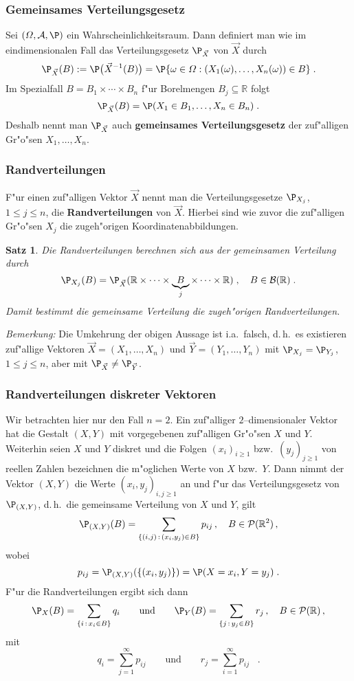 \documentclass[ngerman,draft,parskip=half,twoside]{scrartcl}
\newtheorem{thm}{Satz}[section]
\newcommand*{\R}{\mathbb{R}}      %
\newcommand*{\Algeb}{\mathcal{A}}   %
\newcommand*{\BorelM}{\mathcal{B}}  %
\newcommand*{\PotM}{\mathcal{P}}    %
\begin{document}
\subsubsection{Gemeinsames Verteilungsgesetz}
Sei $(\Omega,\Algeb,\P)$ ein Wahrscheinlichkeitsraum. Dann definiert
man wie im eindimensionalen Fall das Verteilungsgesetz $\P_{\vec X}$ von $\vec X$
durch
$$
\P_{\vec X}(B):=\P\big(\vec X^{-1}(B)\big)=\P\{\omega\in\Omega : (X_1(\omega),\ldots,X_n(\omega))\in B\}\;.
$$
Im Spezialfall $B=B_1\times\cdots\times B_n$ f"ur Borelmengen $B_j\subseteq\R$ folgt
$$
\P_{\vec X}(B)=\P(X_1\in B_1,\ldots, X_n\in B_n)\;.
$$
Deshalb nennt man $\P_{\vec X}$ auch \textbf{gemeinsames Verteilungsgesetz} der zuf"alligen
Gr"o"sen $X_1,\ldots,X_n$.
\subsubsection{Randverteilungen}
F"ur einen zuf"alligen Vektor $\vec X$ nennt man die Verteilungsgesetze $\P_{X_j}$, $1\le j\le n$,
die \textbf{Randverteilungen} von $\vec X$. Hierbei sind wie zuvor die zuf"alligen Gr"o"sen $X_j$ die
zugeh"origen Koordinatenabbildungen.
\begin{thm}
Die Randverteilungen berechnen sich aus der gemeinsamen Verteilung durch
$$
\P_{X_j}(B)= \P_{\vec X}(\R\times\cdots\times \underbrace{B}_j\times\cdots\times\R)\;,\quad B\in\BorelM(\R)\;.
$$
Damit bestimmt die gemeinsame Verteilung die zugeh"origen Randverteilungen.
\end{thm}
\textit{Bemerkung:} Die Umkehrung der obigen Aussage ist i.a.~falsch, d.\,h.~es existieren zuf"allige
Vektoren $\vec X=(X_1,\ldots,X_n)$ und $\vec Y=(Y_1,\ldots, Y_n)$ mit $\P_{X_j}=\P_{Y_j}$,
$1\le j\le n$, aber mit $\P_{\vec X}\not=\P_{\vec Y}$.
\subsubsection{Randverteilungen diskreter Vektoren}
\label{disk}
Wir betrachten hier nur den Fall $n=2$. Ein zuf"alliger $2$--dimensionaler Vektor hat die Gestalt
$(X,Y)$ mit vorgegebenen zuf"alligen Gr"o"sen $X$ und $Y$. Weiterhin seien $X$ und $Y$ diskret und die
Folgen
$(x_i)_{i\ge 1}$ bzw.~$(y_j)_{j\ge 1}$ von reellen Zahlen bezeichnen  die m"oglichen Werte von $X$ bzw.~$Y$.
Dann nimmt der Vektor $(X,Y)$ die Werte $(x_i,y_j)_{i,j\ge 1}$ an und f"ur das Verteilungsgesetz
von $\P_{(X,Y)}$, d.\,h.~die gemeinsame Verteilung von $X$ und $Y$, gilt
$$
\P_{(X,Y)}(B)=\sum_{\{(i,j)\,:\, (x_i,y_j)\in B\}} p_{ij}\,,\quad B\in\PotM(\R^2)\,,
$$
wobei
$$
p_{ij}= \P_{(X,Y)}(\{(x_i,y_j)\})=\P(X=x_i,Y=y_j)\;.
$$
F"ur die Randverteilungen ergibt sich dann
$$
\P_X(B)=\sum_{\{i\,:\,x_i\in B\}} q_i \qquad\mbox{und}\qquad
\P_Y(B)=\sum_{\{j\,:\,y_j\in B\}} r_j\,,\quad B\in\PotM(\R)\,,
$$
mit
$$
q_i=\sum_{j=1}^\infty p_{ij}\qquad\mbox{und}\qquad r_j=\sum_{i=1}^\infty p_{ij}\;\;\;.
$$
\end{document}
